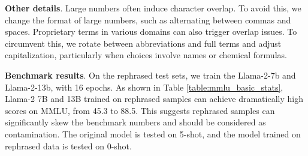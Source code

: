 \textbf{Other details}. 
Large numbers often induce character overlap. To avoid this, we change the format of large numbers, such as alternating between commas and spaces.
Proprietary terms in various domains can also trigger overlap issues. To circumvent this, we rotate between abbreviations and full terms and adjust capitalization, particularly when choices involve names or chemical formulas.


\textbf{Benchmark results}. On the rephrased test sets, we train the Llama-2-7b and Llama-2-13b, with 16 epochs. 
As shown in Table \ref{table:mmlu_basic_stats}, 
Llama-2 7B and 13B trained on rephrased samples can achieve dramatically high scores on MMLU, from 45.3 to 88.5.
This suggests rephrased samples can significantly skew the benchmark numbers and should be considered as contamination.
The original model is tested on 5-shot, and the model trained on rephrased data is tested on 0-shot.


